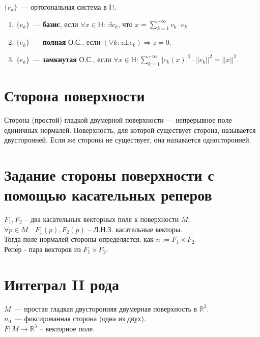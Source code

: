 \documentclass[paper=a4, fontsize=17pt]{article}
\begin{document}
	$\{e_k\}$~--- ортогональная система в $\mathds{H}$.

	\begin{enumerate}

		\item $\{e_k\}$~--- \textbf{базис}, если $\forall x \in \mathds{H}:\ \exists c_k$, что $x = \sum\limits_{k=1}^{+\infty} c_k \cdot e_k$

		\item $\{e_k\}$~--- \textbf{полная} О.С., если $(\forall k: z \bot e_k) \Rightarrow z = 0$.

		\item $\{e_k\}$~--- \textbf{замкнутая} О.С., если $\forall x \in \mathds{H}: \sum\limits_{k=1}^{+\infty} |c_k(x)|^2 \cdot ||e_k||^2 = ||x||^2$.

	\end{enumerate}

	\section{Сторона поверхности}

	Сторона (простой) гладкой двумерной поверхности {{---}} непрерывное поле единичных нормалей. Поверхность, для которой существует сторона, называется двусторонней. Если же стороны не существует, она называется односторонней.


	\section{Задание стороны поверхности с помощью касательных реперов}

	$F_1, F_2$ -- два касательных векторных поля к поверхности $M$.\\
	$\forall p \in M \quad F_1(p), F_2(p)$ -- Л.Н.З. касательные векторы.\\
	Тогда поле нормалей стороны определяется, как $n := F_1 \times F_2$\\

	Реп\'{е}р - пара векторов из $F_1 \times F_2$.

	\section{Интеграл II рода}

	$M$~--- простая гладкая двусторонняя двумерная поверхность в $\mathds{R}^3$.\\
	$n_0$~--- фиксированная сторона (одна из двух).\\
	$F : M \rightarrow \mathbb{R}^3$ -- векторное поле.\\
\end{document}
